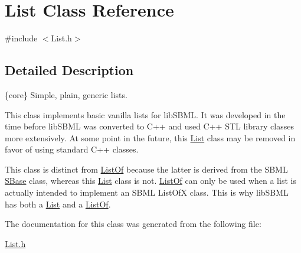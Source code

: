 \hypertarget{class_list}{}\section{List Class Reference}
\label{class_list}


{\ttfamily \#include $<$List.\+h$>$}



\subsection{Detailed Description}
\{core\} Simple, plain, generic lists.



This class implements basic vanilla lists for lib\+S\+B\+ML. It was developed in the time before lib\+S\+B\+ML was converted to C++ and used C++ S\+TL library classes more extensively. At some point in the future, this \hyperlink{class_list}{List} class may be removed in favor of using standard C++ classes.

This class is distinct from \hyperlink{class_list_of}{List\+Of} because the latter is derived from the S\+B\+ML \hyperlink{class_s_base}{S\+Base} class, whereas this \hyperlink{class_list}{List} class is not. \hyperlink{class_list_of}{List\+Of} can only be used when a list is actually intended to implement an S\+B\+ML List\+OfX class. This is why lib\+S\+B\+ML has both a \hyperlink{class_list}{List} and a \hyperlink{class_list_of}{List\+Of}. 

The documentation for this class was generated from the following file\+:\begin{DoxyCompactItemize}
\item 
\hyperlink{_list_8h}{List.\+h}\end{DoxyCompactItemize}
